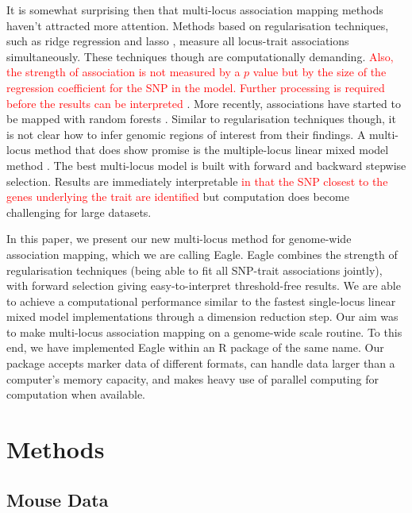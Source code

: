 \documentclass{article}
\begin{document}
It is somewhat surprising then that multi-locus association mapping methods haven't attracted more attention. Methods based on 
regularisation techniques, such as ridge regression \citep{shen2013novel}  and lasso \citep{rakitsch2013lasso}, measure all locus-trait associations simultaneously. These techniques though are computationally demanding. \textcolor{red}{Also, the strength of association is not measured by a $p$ value but by the size of the regression coefficient for the SNP in the model. Further processing is required before the results can be interpreted \citep{cho2010joint, rakitsch2013lasso}}.
More recently, associations have started to be mapped with random forests \citep{szymczak2016r2vim}. Similar to regularisation techniques though, it is not clear how to infer genomic regions of interest from their findings. A multi-locus method that does show promise is the multiple-locus linear mixed model method \citep{segura2012efficient}. The best multi-locus model is built with forward and backward stepwise selection. 
Results are immediately interpretable \textcolor{red}{in that the SNP closest to the genes underlying the trait are identified} 
but computation does become challenging for large datasets. 

In this paper, we present our new multi-locus method for genome-wide association mapping, which we are calling Eagle. 
Eagle combines the strength of regularisation techniques (being able to fit all SNP-trait associations jointly), with forward selection giving easy-to-interpret threshold-free results.   We are able to achieve a computational performance similar to the fastest single-locus linear mixed model implementations 
through a dimension reduction step.
Our aim was to make multi-locus association mapping on a genome-wide scale routine. To this end, we have implemented Eagle 
within an R package of the same name. 
Our package accepts marker data of different 
formats,  can handle data larger than a computer's  memory capacity, and makes heavy use of 
parallel computing for computation when available.  










\section{Methods}

\subsection{Mouse Data}
\end{document}

